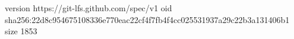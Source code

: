 version https://git-lfs.github.com/spec/v1
oid sha256:22d8c954675108336e770eac22cf4f7fb4f4cc025531937a29c22b3a131406b1
size 1853
